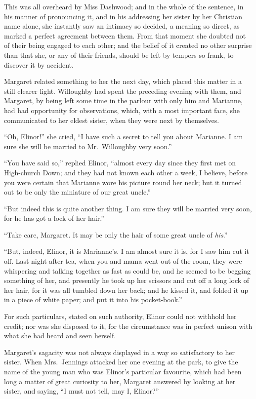 \documentclass{article}
\begin{document}
This was all overheard by Miss Dashwood; and in the
whole of the sentence, in his manner of pronouncing it,
and in his addressing her sister by her Christian name alone,
she instantly saw an intimacy so decided, a meaning
so direct, as marked a perfect agreement between them.
From that moment she doubted not of their being engaged
to each other; and the belief of it created no other surprise
than that she, or any of their friends, should be left
by tempers so frank, to discover it by accident.

Margaret related something to her the next day,
which placed this matter in a still clearer light.
Willoughby had spent the preceding evening with them,
and Margaret, by being left some time in the parlour
with only him and Marianne, had had opportunity
for observations, which, with a most important face,
she communicated to her eldest sister, when they were
next by themselves.

``Oh, Elinor!'' she cried, ``I have such a secret to
tell you about Marianne.  I am sure she will be married
to Mr.\ Willoughby very soon.''

``You have said so,'' replied Elinor, ``almost every
day since they first met on High-church Down; and they
had not known each other a week, I believe, before you
were certain that Marianne wore his picture round her neck;
but it turned out to be only the miniature of our great uncle.''

``But indeed this is quite another thing.  I am sure
they will be married very soon, for he has got a lock
of her hair.''

``Take care, Margaret.  It may be only the hair
of some great uncle of \emph{his}.''

``But, indeed, Elinor, it is Marianne's. I am almost
sure it is, for I saw him cut it off.  Last night
after tea, when you and mama went out of the room,
they were whispering and talking together as fast as
could be, and he seemed to be begging something of her,
and presently he took up her scissors and cut off a long
lock of her hair, for it was all tumbled down her back;
and he kissed it, and folded it up in a piece of white paper;
and put it into his pocket-book.''

For such particulars, stated on such authority,
Elinor could not withhold her credit; nor was she disposed
to it, for the circumstance was in perfect unison with
what she had heard and seen herself.

Margaret's sagacity was not always displayed in a
way so satisfactory to her sister.  When Mrs.\ Jennings
attacked her one evening at the park, to give the name
of the young man who was Elinor's particular favourite,
which had been long a matter of great curiosity to her,
Margaret answered by looking at her sister, and saying,
``I must not tell, may I, Elinor?''
\end{document}
